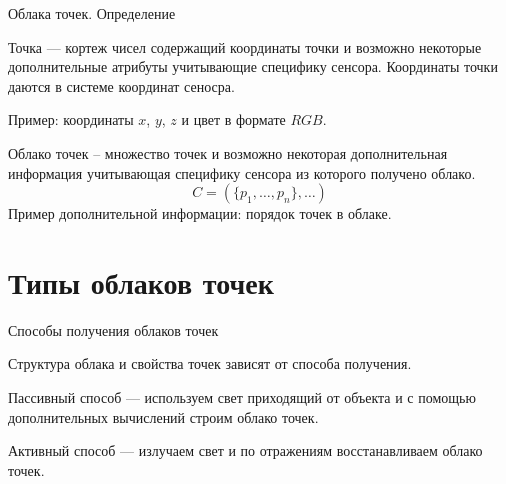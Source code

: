 \documentclass[6pt,pdf,utf8,russian]{beamer}
\begin{document}
\begin{frame}[fragile]{Облака точек. Определение}
    \begin{block}{}
        Точка --- кортеж чисел содержащий координаты точки и возможно некоторые дополнительные
        атрибуты учитывающие специфику сенсора. Координаты точки даются в системе координат сеносра.
    \end{block}

    \pause

    \begin{block}{}
        Пример: координаты $x$, $y$, $z$ и цвет в формате $RGB$.
    \end{block}

    \pause

    \begin{block}{}
        Облако точек -- множество точек и возможно некоторая дополнительная информация
        учитывающая специфику сенсора из которого получено облако.
        \[
            C = (\{p_1,\ldots,p_n\}, \ldots)
        \]
        Пример дополнительной информации: порядок точек в облаке.
    \end{block}
\end{frame}

\section{Типы облаков точек}

\begin{frame}[fragile]{Способы получения облаков точек}
    \begin{block}{}
        Структура облака и свойства точек зависят от способа получения.
    \end{block}

    \pause

    \begin{block}{}
        Пассивный способ --- используем свет приходящий от объекта и
        с помощью дополнительных вычислений строим облако точек.
    \end{block}

    \pause

    \begin{block}{}
        Активный способ --- излучаем свет и по отражениям восстанавливаем облако точек.
    \end{block}
\end{frame}
\end{document}
